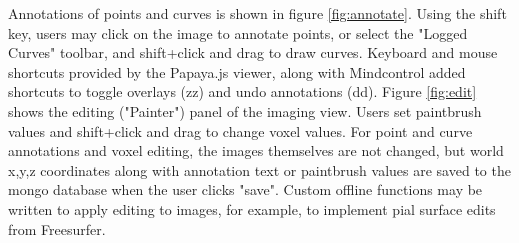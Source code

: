 Annotations of points and curves is shown in figure \ref{fig:annotate}. Using the shift key, users may click on the image to annotate points, or select the "Logged Curves" toolbar, and shift+click and drag to draw curves. Keyboard and mouse shortcuts provided by the Papaya.js viewer, along with Mindcontrol added shortcuts to toggle overlays (zz) and undo annotations (dd). Figure \ref{fig:edit} shows the editing ("Painter") panel of the imaging view. Users set paintbrush values and  shift+click and drag to change voxel values. For point and curve annotations and voxel editing, the images themselves are not changed, but world x,y,z coordinates along with annotation text or paintbrush values are saved to the mongo database when the user clicks "save". Custom offline functions may be written to apply editing to images, for example, to implement pial surface edits from Freesurfer. 